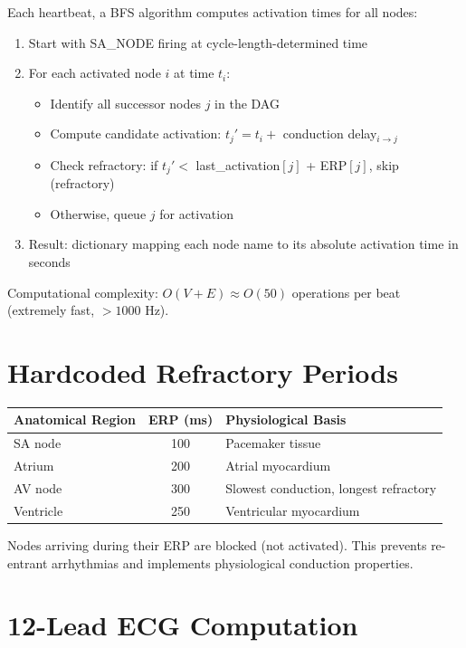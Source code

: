 \documentclass[12pt]{book}
\begin{document}
Each heartbeat, a BFS algorithm computes activation times for all nodes:

\begin{enumerate}
  \item Start with SA\_NODE firing at cycle-length-determined time
  
  \item For each activated node $i$ at time $t_i$:
  \begin{itemize}
    \item Identify all successor nodes $j$ in the DAG
    \item Compute candidate activation: $t_j' = t_i +$ conduction delay$_{i \to j}$
    \item Check refractory: if $t_j' <$ last\_activation$[j]$ + ERP$[j]$, skip (refractory)
    \item Otherwise, queue $j$ for activation
  \end{itemize}
  
  \item Result: dictionary mapping each node name to its absolute activation time in seconds
\end{enumerate}

Computational complexity: $O(V + E) \approx O(50)$ operations per beat (extremely fast, $>1000$ Hz).

\section{Hardcoded Refractory Periods}

\begin{tabular}{|l|c|l|}
\hline
\textbf{Anatomical Region} & \textbf{ERP (ms)} & \textbf{Physiological Basis} \\
\hline
SA node & 100 & Pacemaker tissue \\
Atrium & 200 & Atrial myocardium \\
AV node & 300 & Slowest conduction, longest refractory \\
Ventricle & 250 & Ventricular myocardium \\
\hline
\end{tabular}

Nodes arriving during their ERP are blocked (not activated). This prevents re-entrant arrhythmias and implements physiological conduction properties.

\section{12-Lead ECG Computation}
\end{document}
